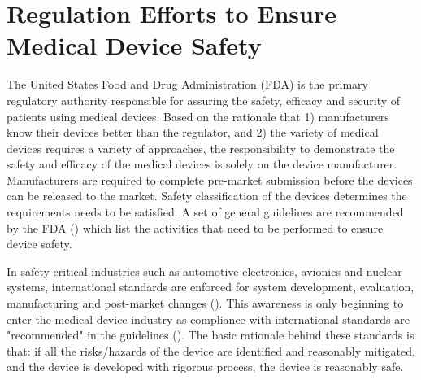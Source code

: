\section{Regulation Efforts to Ensure Medical Device Safety}
The United States Food and Drug Administration (FDA) is the primary regulatory authority responsible for assuring the safety, efficacy and security of patients using medical devices. Based on the rationale that 1) manufacturers know their devices better than the regulator, and 2) the variety of medical devices requires a variety of approaches, the responsibility to demonstrate the safety and efficacy of the medical devices is solely on the device manufacturer. Manufacturers are required to complete pre-market submission before the devices can be released to the market. Safety classification of the devices determines the requirements needs to be satisfied. A set of general guidelines are recommended by the FDA (\cite{fda1, fda2, fda3}) which list the activities that need to be performed to ensure device safety. 

In safety-critical industries such as automotive electronics, avionics and nuclear systems, international standards are enforced for system development, evaluation, manufacturing and post-market changes (\cite{autosar,avsi}). This awareness is only beginning to enter the medical device industry as compliance with international standards are "recommended" in the guidelines (\cite{formal_fda}). The basic rationale behind these standards is that: if all the risks/hazards of the device are identified and reasonably mitigated, and the device is developed with rigorous process, the device is reasonably safe. 

